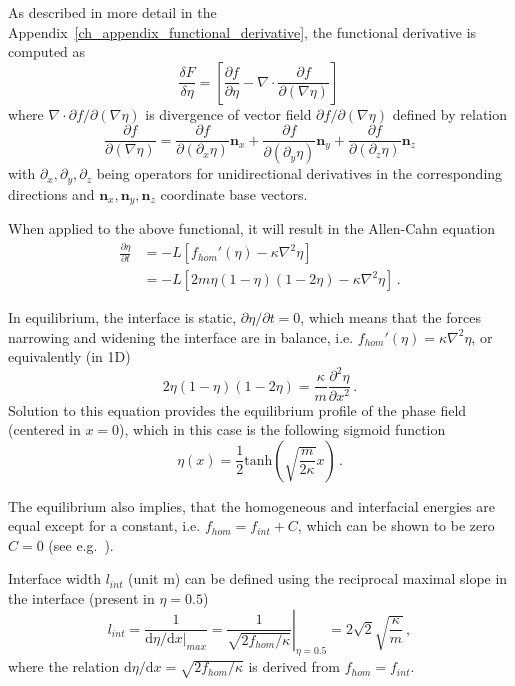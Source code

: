 As described in more detail in the Appendix~\ref{ch_appendix_functional_derivative}, the functional derivative is computed as
\begin{equation}  \label{eq_PFintro_functional_derivative}
	\frac{\delta F}{\delta \eta} = \left[ \frac{\partial f}{\partial \eta} - \nabla\cdot\frac{\partial f}{\partial(\nabla \eta)} \right] \,
\end{equation}
where $\nabla\cdot\partial f/\partial(\nabla \eta)$ is divergence of vector field $\partial f/\partial(\nabla \eta)$ defined by relation
\begin{equation} \label{eq_PFintro_vector_field}
	\frac{\partial f}{\partial(\nabla \eta)} = \frac{\partial f}{\partial(\partial_x\eta)}\mathbf{n}_x + \frac{\partial f}{\partial(\partial_y \eta)}\mathbf{n}_y + \frac{\partial f}{\partial(\partial_z \eta)}\mathbf{n}_z
\end{equation}
with $\partial_x,\partial_y,\partial_z$ being operators for unidirectional derivatives in the corresponding directions and $\mathbf{n}_x,\mathbf{n}_y,\mathbf{n}_z$ coordinate base vectors. 

When applied to the above functional, it will result in the Allen-Cahn equation 
\begin{align}
	\frac{\partial \eta}{\partial t} &= -L[f_{hom}'(\eta) - \kappa\nabla^2\eta]\\
	 &=-L[2m\eta(1-\eta)(1-2\eta) - \kappa\nabla^2\eta] \,.
\end{align}

In equilibrium, the interface is static, $\partial \eta/\partial t = 0$, which means that the forces narrowing and widening the interface are in balance, i.e. $f_{hom}'(\eta) = \kappa\nabla^2\eta$, or equivalently (in 1D)
\begin{equation}
	2\eta(1-\eta)(1-2\eta) = \frac{\kappa}{m}\frac{\partial^2 \eta}{\partial x^2} \,.
\end{equation}
Solution to this equation provides the equilibrium profile of the phase field (centered in $x=0$), which in this case is the following sigmoid function
\begin{equation}
	\eta(x)=\frac{1}{2}\mathrm{tanh}\left(\sqrt{\frac{m}{2\kappa}}x\right) \,.
\end{equation}

The equilibrium also implies, that the homogeneous and interfacial energies are equal except for a constant, i.e. $f_{hom}=f_{int} + C$, which can be shown to be zero $C=0$ (see e.g.~\cite{Moelans2008}).

Interface width $l_{int}$ (unit \unit{\m}) can be defined using the reciprocal maximal slope in the interface (present in $\eta=0.5$)
\begin{equation}\label{eq_def_IW_fund_formula}
	l_{int} = \frac{1}{\mathrm{d}\eta/\mathrm{d}x|_{max}}=\left.\frac{1}{\sqrt{2 f_{hom}/\kappa}}\right|_{\eta=0.5} = 2\sqrt{2}\sqrt{\frac{\kappa}{m}} \,,
\end{equation}
where the relation $\mathrm{d}\eta/\mathrm{d}x=\sqrt{2 f_{hom}/\kappa}$ is derived from $f_{hom}=f_{int}$.


